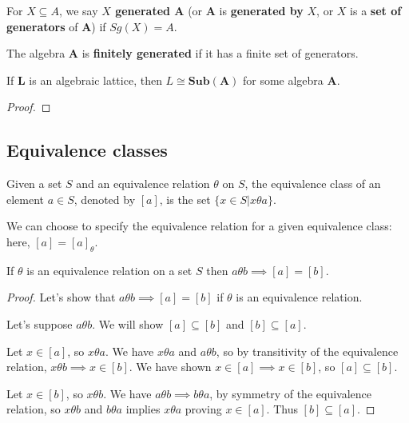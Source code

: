 \begin{definition}
	For $X \subseteq A$, we say \textbf{$X$ generated $\boldsymbol{A}$} (or $\boldsymbol{A}$ is \textbf{generated by} $X$, or $X$ is a \textbf{set of generators} of $\boldsymbol{A}$) if $Sg(X) = A$.

	The algebra $\boldsymbol{A}$ is \textbf{finitely generated} if it has a finite set of generators.
\end{definition}

\begin{theorem}
  If $\boldsymbol{L}$ is an algebraic lattice, then
  $L \cong \boldsymbol{Sub}(\boldsymbol{A})$ for some algebra $\boldsymbol{A}$.
\end{theorem}

\begin{proof}

\end{proof}

\subsection{Equivalence classes}

\begin{definition} Given a set $S$ and an equivalence
relation $\theta$ on $S$, the equivalence class of an element $a \in S$, denoted
by $[a]$, is the set $\{x \in S | x \theta a\}$.
\end{definition}

\begin{notation}
  We can choose to specify the equivalence relation for a given equivalence
  class: here, $[a] = [a]_{\theta}$.
\end{notation}

\begin{prop} If $\theta$ is an equivalence relation on a set $S$ then $a \theta
b \implies [a] = [b]$.
\end{prop}

\begin{proof} Let's show that $a \theta b \implies [a] = [b]$ if $\theta$ is an
equivalence relation.

  Let's suppose $a \theta b$. We will show $[a] \subseteq [b]$ and $[b]
\subseteq [a]$.

  Let $x \in [a]$, so $x \theta a$. We have $x \theta a$ and $a \theta b$, so by
transitivity of the equivalence relation, $x \theta b \implies x \in [b]$. We
have shown $x \in [a] \implies x \in [b]$, so $[a] \subseteq [b]$.

  Let $x \in [b]$, so $x \theta b$. We have $a \theta b \implies b \theta a$, by
symmetry of the equivalence relation, so $x \theta b$ and $b \theta a$ implies
$x \theta a$ proving $x \in [a]$. Thus $[b] \subseteq [a]$.
\end{proof}

